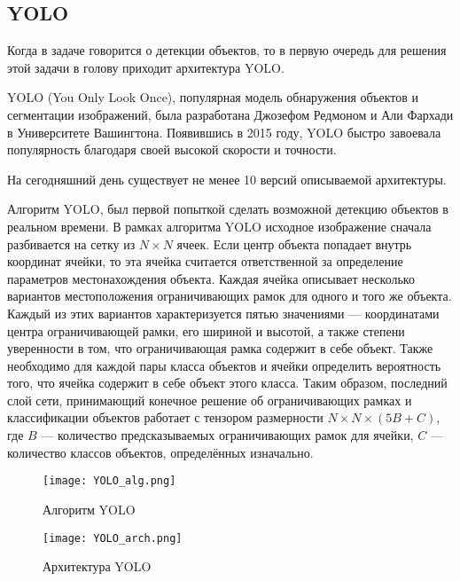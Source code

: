 \documentclass[../document.tex]{subfiles}
\begin{document}
    \subsection{YOLO}
	    \par Когда в задаче говорится о детекции объектов, то в первую очередь для решения этой задачи в голову приходит архитектура YOLO.
	    \par YOLO (You Only Look Once), популярная модель обнаружения объектов и сегментации изображений, была разработана Джозефом Редмоном и Али Фархади в Университете Вашингтона. Появившись в 2015 году, YOLO быстро завоевала популярность благодаря своей высокой скорости и точности.
	    \par На сегодняшний день существует не менее 10 версий описываемой архитектуры.
	    \par Алгоритм YOLO, был первой попыткой сделать возможной детекцию объектов в реальном времени. В рамках алгоритма YOLO исходное изображение сначала разбивается на сетку из $N×N$ ячеек. Если центр объекта попадает внутрь координат ячейки, то эта ячейка считается ответственной за определение параметров местонахождения объекта. Каждая ячейка описывает несколько вариантов местоположения ограничивающих рамок для одного и того же объекта. Каждый из этих вариантов характеризуется пятью значениями — координатами центра ограничивающей рамки, его шириной и высотой, а также степени уверенности в том, что ограничивающая рамка содержит в себе объект. Также необходимо для каждой пары класса объектов и ячейки определить вероятность того, что ячейка содержит в себе объект этого класса. Таким образом, последний слой сети, принимающий конечное решение об ограничивающих рамках и классификации объектов работает с тензором размерности $N×N×(5B+C)$, где $B$ — количество предсказываемых ограничивающих рамок для ячейки, $C$ — количество классов объектов, определённых изначально.
	    
	    \begin{figure}[H]
	    	\centering
	    	\texttt{[image: YOLO\_alg.png]}
	    	\caption{Алгоритм YOLO}
	    \end{figure}
	    \begin{figure}[H]
	    	\centering
	    	\texttt{[image: YOLO\_arch.png]}
	    	\caption{Архитектура YOLO}
		\end{figure}
	
\end{document}
